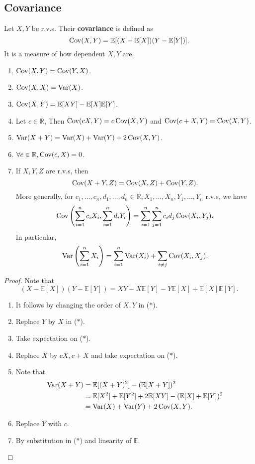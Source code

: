 \subsection{Covariance}
\begin{definition}
    Let $X,Y$ be r.v.s. Their \textbf{covariance} is defined as 
    \[
        \operatorname{Cov} (X,Y) = \mathbb{E}[(X-\mathbb{E}[X])(Y-\mathbb{E}[Y])].
    \]
    It is a measure of how dependent $X,Y$ are.
\end{definition}
\begin{proposition}
    \begin{enumerate}
        \item $ \operatorname{Cov}(X,Y)=\operatorname{Cov}(Y,X) $.
        \item $ \operatorname{Cov}(X,X)=\operatorname{Var}(X) $.
        \item $ \operatorname{Cov}(X,Y) = \mathbb{E}[XY]-\mathbb{E}[X]\mathbb{E}[Y] $.
        \item Let $c\in \mathbb{R}$, Then $ \operatorname{Cov}(cX,Y) = c\operatorname{Cov}(X,Y) $ and $ \operatorname{Cov}(c+X,Y)=\operatorname{Cov}(X,Y) $.
        \item $ \operatorname{Var}(X+Y) = \operatorname{Var}(X)+\operatorname{Var}(Y)+2\operatorname{Cov}(X,Y) $.
        \item $ \forall c\in \mathbb{R}, \operatorname{Cov}(c,X)=0 $.
        \item If $ X,Y,Z $ are r.v.s, then 
        \[
            \operatorname{Cov}(X+Y,Z) = \operatorname{Cov}(X,Z)+\operatorname{Cov}(Y,Z).
        \]
        More generally, for $ c_1,\dots,c_n,d_1,\dots,d_n\in \mathbb{R}, X_1,\dots,X_n,Y_1,\dots,Y_n $ r.v.s, we have 
        \[
            \operatorname{Cov} \left( \sum_{i=1}^{n}c_i X_i,\sum_{i=1}^{n}d_i Y_i \right) = \sum_{i=1}^{n}\sum_{j=1}^{n}c_i d_j\operatorname{Cov}(X_i,Y_j).
        \]
        In particular, 
        \[
            \operatorname{Var}\left( \sum_{i=1}^{n}X_i \right) = \sum_{i=1}^{n}\operatorname{Var}(X_i)+\sum_{i\neq j} \operatorname{Cov}(X_i,X_j).
        \]
    \end{enumerate}
\end{proposition}
\begin{proof}
    Note that 
    \[
        (X-\mathbb{E}[X])(Y-\mathbb{E}[Y]) = XY-X\mathbb{E}[Y]-Y\mathbb{E}[X]+\mathbb{E}[X]\mathbb{E}[Y].\tag{$*$}
    \]
    \begin{enumerate}
        \item It follows by changing the order of $X,Y$ in ($*$).
        \item Replace $Y$ by $X$ in ($*$).
        \item Take expectation on ($*$).
        \item Replace $X$ by $cX,c+X$ and take expectation on ($*$).
        \item Note that 
        \begin{align*}
            \operatorname{Var}(X+Y)&= \mathbb{E}[(X+Y)^2]-(\mathbb{E}[X+Y])^2\\ 
            &= \mathbb{E}[X^2]+\mathbb{E}[Y^2]+2\mathbb{E}[XY]-(\mathbb{E}[X]+\mathbb{E}[Y])^2\\ 
            &= \operatorname{Var}(X)+\operatorname{Var}(Y)+2\operatorname{Cov}(X,Y).
        \end{align*}
        \item Replace $Y$ with $c$.
        \item By substitution in ($*$) and linearity of $ \mathbb{E} $.
    \end{enumerate}
\end{proof}

